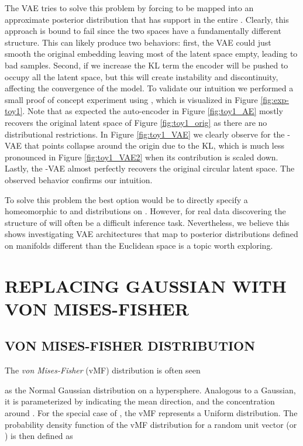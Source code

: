 \documentclass[letterpaper]{article}
\begin{document}
The VAE tries to solve this problem by forcing  to be mapped into an approximate posterior distribution that has support in the entire . Clearly, this approach is bound to fail since the two spaces have a fundamentally different structure. This can likely produce two behaviors: first, the VAE could just smooth the original embedding  leaving most of the latent space empty, leading to bad samples. Second, if we increase the KL term the encoder will be pushed to occupy all the latent space, but this will create instability and discontinuity, affecting the convergence of the model. To validate our intuition we performed a small proof of concept experiment using , which is visualized in Figure \ref{fig:exp-toy1}. Note that as expected the auto-encoder in Figure \ref{fig:toy1_AE} mostly recovers the original latent space of Figure \ref{fig:toy1_orig} as there are no distributional restrictions. In Figure \ref{fig:toy1_VAE} we clearly observe for the \Nv-VAE that points collapse around the origin due to the KL, which is much less pronounced in Figure \ref{fig:toy1_VAE2} when its contribution is scaled down. Lastly, the \Sv-VAE almost perfectly recovers the original circular latent space. The observed behavior confirms our intuition. 

To solve this problem the best option would be to directly specify a  homeomorphic to  and distributions on . However, for real data discovering the structure of  will often be a difficult inference task. Nevertheless, we believe this shows investigating VAE architectures that map to posterior distributions
defined on manifolds different than the Euclidean space is a topic worth exploring. 
\vspace{-1.0em}
\section{REPLACING GAUSSIAN WITH VON MISES-FISHER}
\subsection{VON MISES-FISHER DISTRIBUTION}\label{subsec:vMF}
The \textit{von Mises-Fisher} (vMF) distribution is often seen 

as the Normal Gaussian distribution on a hypersphere. 
Analogous to a Gaussian, it is parameterized by  indicating the mean direction, and  the concentration around . For the special case of , the vMF represents a Uniform distribution. The probability density function of the vMF distribution for a random unit vector  (or ) is then defined as
\end{document}
